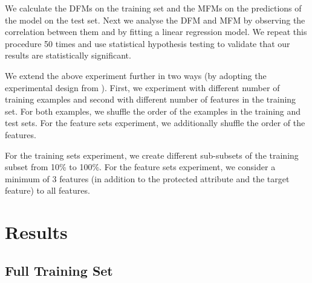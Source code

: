 \documentclass{article}
\begin{document}

We calculate the DFMs on the training set and the MFMs on the
predictions of the model on the test set. Next we analyse the DFM and
MFM by observing the correlation between them and by fitting a linear
regression model. We repeat this procedure 50 times and use
statistical hypothesis testing to validate that our results are
statistically significant.

We extend the above experiment further in two ways (by adopting the
experimental design from \cite{zhang2021ignorance}). First, we
experiment with different number of training examples and second with
different number of features in the training set. For both examples,
we shuffle the order of the examples in the training and test sets. For
the feature sets experiment, we additionally shuffle the order of the
features.

For the training sets experiment, we create different sub-subsets of
the training subset from 10\% to 100\%. For the feature sets
experiment, we consider a minimum of 3 features (in addition to the
protected attribute and the target feature) to all features.


\section{Results}\label{sec:results}

\subsection{Full Training Set}\label{sec:results-full-data}
\end{document}
